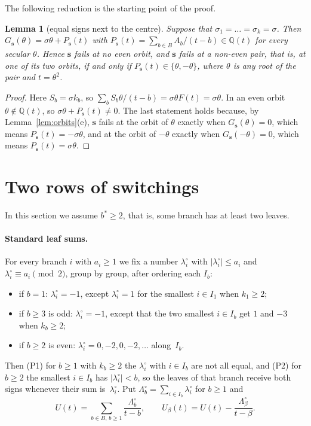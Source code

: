 \documentclass[11pt]{article}
\numberwithin{equation}{section}
\newtheorem{lemma}{Lemma}[section]
\theoremstyle{remark}
\newcommand{\Q}{\mathbb Q}
\newcommand{\s}{\mathbf s}
\begin{document}
The following reduction is the starting point of the proof.

\begin{lemma}[equal signs next to the centre]\label{lem:equal}
Suppose that $\sigma_1=\dots=\sigma_k=\sigma$. Then
$G_{\s}(\theta)=\sigma\theta+P_{\s}(t)$ with
$P_{\s}(t)=\sum_{b\in B}A_b/(t-b)\in\Q(t)$ for every secular $\theta$. Hence
$\s$ fails at no even orbit, and $\s$ fails at a non-even pair, that is, at one
of its two orbits, if and only if $P_{\s}(t)\in\{\theta,-\theta\}$, where
$\theta$ is any root of the pair and $t=\theta^2$.
\end{lemma}
\begin{proof}
Here $S_b=\sigma k_b$, so $\sum_bS_b\theta/(t-b)=\sigma\theta F(t)=\sigma\theta$.
In an even orbit $\theta\notin\Q(t)$, so $\sigma\theta+P_{\s}(t)\ne0$. The last
statement holds because, by Lemma~\ref{lem:orbits}(e), $\s$ fails at the orbit
of $\theta$ exactly when $G_{\s}(\theta)=0$, which means
$P_{\s}(t)=-\sigma\theta$, and at the orbit of $-\theta$ exactly when
$G_{\s}(-\theta)=0$, which means $P_{\s}(t)=\sigma\theta$.
\end{proof}

\section{Two rows of switchings}\label{sec:rows}

In this section we assume $b^*\ge2$, that is, some branch has at least two
leaves.

\paragraph{Standard leaf sums.}
For every branch $i$ with $a_i\ge1$ we fix a number $\lambda^\circ_i$ with
$|\lambda^\circ_i|\le a_i$ and $\lambda^\circ_i\equiv a_i\pmod 2$, group by
group, after ordering each $I_b$:
\begin{itemize}
\item if $b=1$: $\lambda^\circ_i=-1$, except $\lambda^\circ_i=1$ for the
 smallest $i\in I_1$ when $k_1\ge2$;
\item if $b\ge3$ is odd: $\lambda^\circ_i=-1$, except that the two smallest
 $i\in I_b$ get $1$ and $-3$ when $k_b\ge2$;
\item if $b\ge2$ is even: $\lambda^\circ_i=0,-2,0,-2,\dots$ along~$I_b$.
\end{itemize}
Then (P1) for $b\ge1$ with $k_b\ge2$ the $\lambda^\circ_i$ with $i\in I_b$ are
not all equal, and (P2) for $b\ge2$ the smallest $i\in I_b$ has
$|\lambda^\circ_i|<b$, so the leaves of that branch receive both signs whenever
their sum is~$\lambda^\circ_i$. Put $\Lambda^\circ_b=\sum_{i\in
I_b}\lambda^\circ_i$ for $b\ge1$ and
\[
 U(t)=\sum_{b\in B,\,b\ge1}\frac{\Lambda^\circ_b}{t-b},\qquad
 U_\beta(t)=U(t)-\frac{\Lambda^\circ_\beta}{t-\beta}.
\]
\end{document}
